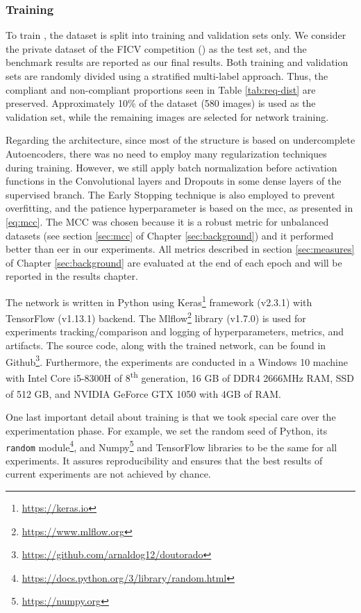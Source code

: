 \subsubsection{Training} 

To train \methodname, the \ficvtest dataset is split into training and validation sets only. We consider the private dataset of the FICV competition (\ficvofficial) as the test set, and the benchmark results are reported as our final results. Both training and validation sets are randomly divided using a stratified multi-label approach. Thus, the compliant and non-compliant proportions seen in Table \ref{tab:req-dist} are preserved. Approximately 10\% of the dataset (580 images) is used as the validation set, while the remaining images are selected for network training.

Regarding the architecture, since most of the \methodname structure is based on undercomplete Autoencoders, there was no need to employ many regularization techniques during training. However, we still apply batch normalization before activation functions in the Convolutional layers and Dropouts in some dense layers of the supervised branch. The Early Stopping technique is also employed to prevent overfitting, and the patience hyperparameter is based on the \acl{mcc}, as presented in \autoref{eq:mcc}. The MCC was chosen because it is a robust metric for unbalanced datasets (see section \ref{sec:mcc} of Chapter \ref{sec:background}) and it performed better than \acs{eer} in our experiments. All metrics described in section \ref{sec:measures} of Chapter \ref{sec:background} are evaluated at the end of each epoch and will be reported in the results chapter.

The network is written in Python using Keras\footnote{\url{https://keras.io}} framework (v2.3.1) with TensorFlow (v1.13.1) backend. The Mlflow\footnote{\url{https://www.mlflow.org}} library (v1.7.0) is used for experiments tracking/comparison and logging of hyperparameters, metrics, and artifacts. The source code, along with the trained network, can be found in Github\footnote{\url{https://github.com/arnaldog12/doutorado}}. Furthermore, the experiments are conducted in a Windows 10 machine with Intel\textsuperscript{\tiny\textregistered} Core\textsuperscript{\tiny\texttrademark} i5-8300H of 8\textsuperscript{th} generation, 16 GB of DDR4 2666MHz RAM, SSD of 512 GB, and NVIDIA\textsuperscript{\tiny\textregistered} GeForce\textsuperscript{\tiny\textregistered} GTX 1050 with 4GB of RAM.

One last important detail about \methodname training is that we took special care over the experimentation phase. For example, we set the random seed of Python, its \texttt{random} module\footnote{\url{https://docs.python.org/3/library/random.html}}, and Numpy\footnote{\url{https://numpy.org}} and TensorFlow libraries to be the same for all experiments. It assures reproducibility and ensures that the best results of current experiments are not achieved by chance.

